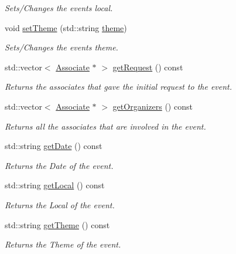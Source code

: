 \begin{DoxyCompactItemize}
\begin{DoxyCompactList}\small\item\em Sets/\+Changes the event\textquotesingle{}s local. \end{DoxyCompactList}\item 
void \hyperlink{classEvent_abdd2c869f0231002c2a16813923586fb}{set\+Theme} (std\+::string \hyperlink{classEvent_aa9cc4378d5cecaadc8e6de92b313e6f8}{theme})
\begin{DoxyCompactList}\small\item\em Sets/\+Changes the event\textquotesingle{}s theme. \end{DoxyCompactList}\item 
std\+::vector$<$ \hyperlink{classAssociate}{Associate} $\ast$ $>$ \hyperlink{classEvent_a424a2862591a8437b0d18366c7aee247}{get\+Request} () const
\begin{DoxyCompactList}\small\item\em Returns the associates that gave the initial request to the event. \end{DoxyCompactList}\item 
std\+::vector$<$ \hyperlink{classAssociate}{Associate} $\ast$ $>$ \hyperlink{classEvent_a7e09dd7707422e30104727a069573e88}{get\+Organizers} () const
\begin{DoxyCompactList}\small\item\em Returns all the associates that are involved in the event. \end{DoxyCompactList}\item 
std\+::string \hyperlink{classEvent_a42abbf59c83e3fa6c964463a5e65ea00}{get\+Date} () const
\begin{DoxyCompactList}\small\item\em Returns the Date of the event. \end{DoxyCompactList}\item 
std\+::string \hyperlink{classEvent_aa2b3aee8416f68b890083a09eecfea8b}{get\+Local} () const
\begin{DoxyCompactList}\small\item\em Returns the Local of the event. \end{DoxyCompactList}\item 
std\+::string \hyperlink{classEvent_ad83e88dd2fe78a6840dd2c71d217b490}{get\+Theme} () const
\begin{DoxyCompactList}\small\item\em Returns the Theme of the event. \end{DoxyCompactList}\item 

\end{DoxyCompactItemize}
